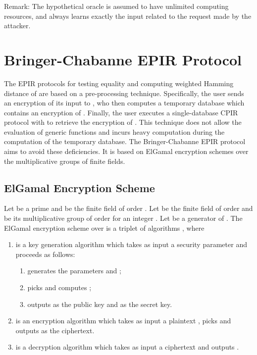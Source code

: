 \documentclass[JMC]{degruyter-journal}
\begin{document}
 \vspace{-0.25cm}
 Remark: The hypothetical oracle  is assumed
to have unlimited computing resources, and
  always learns exactly the input related
to the request made by the attacker.



\section{Bringer-Chabanne EPIR Protocol  }

The EPIR protocols for testing equality and computing weighted
Hamming distance of \cite{BCPT07} are based on a  pre-processing
technique. Specifically, the user  sends an encryption of its input
 to , who then computes a temporary database
which contains  an encryption of . Finally, the user
executes a
 single-database CPIR protocol with  to retrieve the encryption of .
This technique does not
allow the evaluation of  generic functions and incurs heavy
computation during the computation of the temporary database. The
Bringer-Chabanne EPIR protocol   aims to
 avoid these deficiencies. It is based on  ElGamal encryption schemes  over the multiplicative groups
 of finite fields.




\subsection{ElGamal Encryption Scheme}\label{sec:elgamal}

Let  be a prime and  be the finite field of order
. Let  be the
 finite field of order   and  be its  multiplicative group  of order 
for an integer . Let  be a generator of .
The ElGamal encryption scheme over   is a triplet of  algorithms ,
where
\begin{enumerate}
\item  is a key generation algorithm which takes as input a security parameter  and proceeds as follows:
        \begin{enumerate}
             \item  generates the parameters  and ;
             \item  picks   and computes ;
            \item   outputs  as the public key and  as  the secret key.
       \end{enumerate}

\item  is an encryption algorithm which takes as input a plaintext , picks
   and outputs    as the ciphertext.
\item    is a decryption algorithm which  takes as input a ciphertext  and outputs
.
\end{enumerate}
\end{document}

